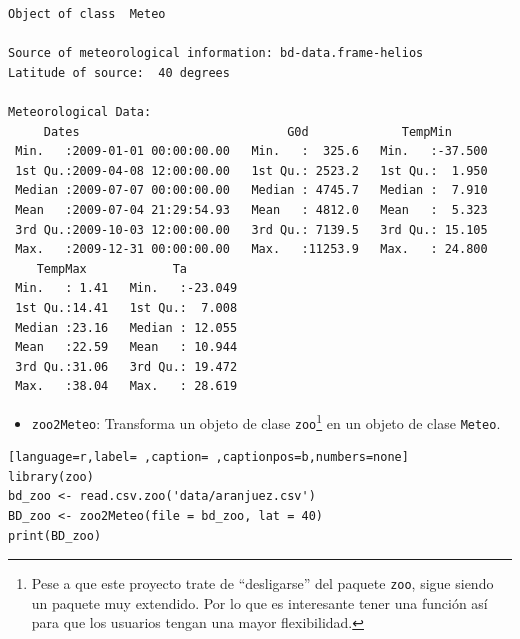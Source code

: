 \begin{verbatim}
Object of class  Meteo 

Source of meteorological information: bd-data.frame-helios 
Latitude of source:  40 degrees

Meteorological Data:
     Dates                             G0d             TempMin       
 Min.   :2009-01-01 00:00:00.00   Min.   :  325.6   Min.   :-37.500  
 1st Qu.:2009-04-08 12:00:00.00   1st Qu.: 2523.2   1st Qu.:  1.950  
 Median :2009-07-07 00:00:00.00   Median : 4745.7   Median :  7.910  
 Mean   :2009-07-04 21:29:54.93   Mean   : 4812.0   Mean   :  5.323  
 3rd Qu.:2009-10-03 12:00:00.00   3rd Qu.: 7139.5   3rd Qu.: 15.105  
 Max.   :2009-12-31 00:00:00.00   Max.   :11253.9   Max.   : 24.800  
    TempMax            Ta         
 Min.   : 1.41   Min.   :-23.049  
 1st Qu.:14.41   1st Qu.:  7.008  
 Median :23.16   Median : 12.055  
 Mean   :22.59   Mean   : 10.944  
 3rd Qu.:31.06   3rd Qu.: 19.472  
 Max.   :38.04   Max.   : 28.619
\end{verbatim}

\begin{itemize}
\item \texttt{zoo2Meteo}: Transforma un objeto de clase \texttt{zoo}\footnote{Pese a que este proyecto trate de ``desligarse'' del paquete \texttt{zoo}, sigue siendo un paquete muy extendido. Por lo que es interesante tener una función así para que los usuarios tengan una mayor flexibilidad.} en un objeto de clase \texttt{Meteo}.
\end{itemize}
\begin{lstlisting}[language=r,label= ,caption= ,captionpos=b,numbers=none]
library(zoo)
bd_zoo <- read.csv.zoo('data/aranjuez.csv')
BD_zoo <- zoo2Meteo(file = bd_zoo, lat = 40)
print(BD_zoo)
\end{lstlisting}

